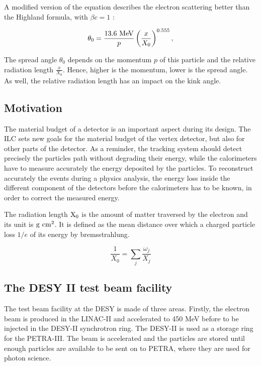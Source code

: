     A modified version of the equation describes the electron scattering better than the Highland formula, with $\beta c = 1$ \cite{GEANT4}:

    \begin{equation}
      \theta_{0} = \frac{13.6~\rm{MeV}}{p}\left(\frac{x}{X_{0}}\right)^{0.555},
    \end{equation}

    The spread angle $\theta_{0}$ depends on the momentum $p$ of this particle and the relative radiation length $\frac{x}{X_{0}}$.
    Hence, higher is the momentum, lower is the spread angle. 
    As well, the relative radiation length has an impact on the kink angle. 

    \subsection{Motivation}

    The material budget of a detector is an important aspect during its design.
    The \gls{ILC} sets new goals for the material budget of the vertex detector, but also for other parts of the detector.
    As a reminder, the tracking system should detect precisely the particles path without degrading their energy, while the calorimeters have to measure accurately the energy deposited by the particles.
    To reconstruct accurately the events during a physics analysis, the energy loss inside the different component of the detectors before the calorimeters has to be known, in order to correct the measured energy.

    The radiation length $\rm{X_{0}}$ is the amount of matter traversed by the electron and its unit is $\rm{g}~{cm}^{2}$.
    It is defined as the mean distance over which a charged particle loss $1/e$ of its energy by bremsstrahlung.

    \begin{equation}
      \frac{1}{X_{0}} = \sum_{j} \frac{\omega_{j}}{X_{j}}
    \end{equation}

    \subsection{The DESY II test beam facility}

    The test beam facility at the \gls{DESY} is made of three areas.
    Firstly, the electron beam is produced in the LINAC-II and accelerated to 450 MeV before to be injected in the DESY-II synchrotron ring.
    The DESY-II is used as a storage ring for the PETRA-III. 
    The beam is accelerated and the particles are stored until enough particles are available to be sent on to PETRA, where they are used for photon science.
    
